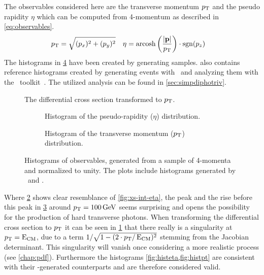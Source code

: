 The observables considered here are the transverse momentum \(p_\mathrm{T}\)
and the pseudo rapidity \(\eta\) which can be computed from 4-momentum
as described in \cref{eq:observables}.
%
\begin{align}
  \label{eq:observables}
  p_\mathrm{T} &= \sqrt{(p_x)^2+(p_y)^2} & \eta &=
                                         \operatorname{arcosh}\qty(\frac{\abs{\vb{p}}}{p_\mathrm{T}})\cdot\operatorname{sgn}(p_z)
\end{align}
%
The histograms in \cref{fig:histos} have been created by generating
 samples.  also
contains reference histograms created by generating events with
\sherpa\ and analyzing them with the \rivet\
toolkit~\cite{Bierlich:2019rhm}. The utilized analysis can be found
in \cref{sec:simpdiphotriv}.
%
\begin{figure}[ht]
  \centering {}
  \caption{\label{fig:diff-xs-pt} The differential cross section
    transformed to \(p_\mathrm{T}\).}
\end{figure}
%
\begin{figure}[p]
  \centering

  \begin{subfigure}[b]{\textwidth}
    \centering {}
    \caption{\label{fig:histeta} Histogram of the pseudo-rapidity
      (\(\eta\)) distribution.}
  \end{subfigure}
  \begin{subfigure}[b]{\textwidth}
    \centering {}
    \caption{\label{fig:histpt} Histogram of the transverse momentum
      (\(p_\mathrm{T}\)) distribution.}
  \end{subfigure}
  \caption{\label{fig:histos} Histograms of observables, generated
    from a sample of 4-momenta and normalized to unity. The plots
    include histograms generated by \sherpa\ and \rivet.}
\end{figure}
%
Where \cref{fig:histeta} shows clear resemblance of
\cref{fig:xs-int-eta}, the peak and the rise before this peak in
\cref{fig:histpt} around \(p_\mathrm{T}=\SI{100}{\giga\electronvolt}\) seems
surprising and opens the possibility for the production of hard
transverse photons. When transforming the differential cross section
to \(p_\mathrm{T}\) it can be seen in \cref{fig:diff-xs-pt} that there really
is a singularity at \(p_\mathrm{T} = \operatorname{E_{\text{CM}}}\), due to a term
\(1/\sqrt{1-(2\cdot p_\mathrm{T}/\operatorname{E_{\text{CM}}})^2}\) stemming from the Jacobian
determinant.  This singularity will vanish once considering a more
realistic process (see \cref{chap:pdf}). Furthermore the histograms
\cref{fig:histeta,fig:histpt} are consistent with their
\rivet-generated counterparts and are therefore considered valid.


